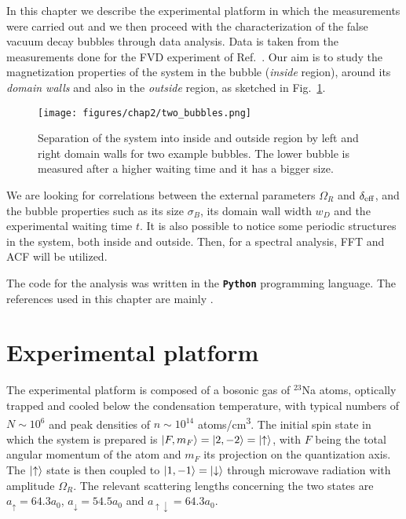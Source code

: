 In this chapter we describe the experimental platform in which the measurements were carried out and we then proceed with the characterization of the false vacuum decay bubbles through data analysis. Data is taken from the measurements done for the FVD experiment of Ref.\ \cite{zenesini2024false}. Our aim is to study the magnetization properties of the system in the bubble (\textit{inside} region), around its \textit{domain walls} and also in the \textit{outside} region, as sketched in Fig.\ \ref{fig:2bubbles}. 
\begin{figure}[ht!]
    \centering
    \texttt{[image: figures/chap2/two\_bubbles.png]}
    \caption{Separation of the system into inside and outside region by left and right domain walls for two example bubbles. The lower bubble is measured after a higher waiting time and it has a bigger size.}
    \label{fig:2bubbles}
\end{figure}
We are looking for correlations between the external parameters $\Omega_R$ and $\delta_{\rm eff}$, and the bubble properties such as its size $\sigma_B$, its domain wall width $w_D$ and the experimental waiting time $t$. It is also possible to notice some periodic structures in the system, both inside and outside. Then, for a spectral analysis, FFT and ACF will be utilized. 

The code for the analysis was written in the \textbf{\texttt{Python}} programming language. The references used in this chapter are mainly \cite{cominotti2023ferro,farolfi2021,cominotti2023experiments,cominotti2024ultracold}.

\section{Experimental platform}
The experimental platform is composed of a bosonic gas of $^{23}$Na atoms, optically trapped and cooled below the condensation temperature, with typical numbers of $N \sim 10^6$ and peak densities of $n \sim 10^{14}$ atoms/\unit{\centi\meter\cubed}. The initial spin state in which the system is prepared is $\ket{F, m_F} = \ket{2, -2} = \ket{\uparrow}$, with $F$ being the total angular momentum of the atom 
and $m_F$ its projection on the quantization axis. The $\ket{\uparrow}$ state is then coupled to $\ket{1, -1} = \ket{\downarrow}$ through microwave radiation with amplitude $\Omega_R$. The relevant scattering lengths concerning the two states are $a_\uparrow = 64.3 a_0$, $a_\downarrow = 54.5 a_0$ and $a_{\uparrow\downarrow} = 64.3 a_0$.

